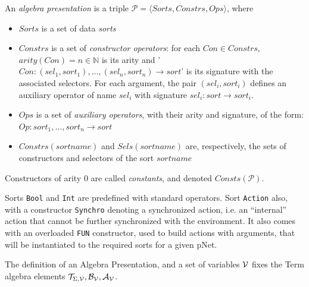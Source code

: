 \documentclass[smallcondensed]{svjour3}
\newcommand{\noteSB}[2][color=green!40, size=\tiny]{\todo[#1]{{\bf
      Note: } {#2}}}
\newcommand{\cT}{\ensuremath{\mathcal{T}}}
\newcommand{\cV}{\ensuremath{\mathcal{V}}}
\newcommand{\signature}{\ensuremath{\Sigma}}
\newcommand{\variables}{\ensuremath{\cV}}
\newcommand{\Talg}{\ensuremath{\cT_{\signature,\variables}}}
\def\AlgA{\mathcal{A}}
\def\AlgB{\mathcal{B}}
\newcommand{\mdash}{---}
\begin{document}
\def\APres{\mathcal{P}}
\begin{definition}
  An \emph{algebra presentation} is a triple $\APres=\langle\mathit{Sorts},\mathit{Constrs},\mathit{Ops}\rangle$, where

  \begin{itemize}
  \item $Sorts$ is a set of data \emph{sorts}
  \item $\mathit{Constrs}$ is a set of \emph{constructor operators}: for each $\mathit{Con} \in \mathit{Constrs}$, $arity(Con)=n \in \mathbb{N}$ is its arity 
    and '$Con : (\mathit{sel}_1,\mathit{sort}_1), \dots, (\mathit{sel}_n,\mathit{sort}_n) \rightarrow \mathit{sort}$' is its signature with the associated selectors.
    For each argument, the pair $(\mathit{sel}_i,\mathit{sort}_i)$ defines an auxiliary
    operator of name $\mathit{sel}_i$ with signature $\mathit{sel}_i : \mathit{sort} \rightarrow \mathit{sort}_i$.
    \item $Ops$ is a set of \emph{auxiliary operators}, with their
      arity and signature, of the form: $Op : \mathit{sort}_1, \dots,  \mathit{sort}_n \rightarrow
      \mathit{sort}$
      \item $\mathit{Constrs}(\mathit{sortname})$ and $\mathit{Sels}(\mathit{sortname})$ are, respectively, the sets of
        constructors and selectors of the sort $\mathit{sortname}$
  \end{itemize}
  Constructors of arity 0 are called \emph{constants}, and denoted $\mathit{Consts}(\APres)$.
\end{definition}


Sorts \texttt{Bool} and \texttt{Int} are predefined with standard operators.
Sort \texttt{Action} also, with a constructor \texttt{Synchro} denoting
a synchronized action, i.e. an ``internal'' action that cannot be
further synchronized with the environment. It also comes with an
overloaded \texttt{FUN} constructor, used to build actions with
arguments, that will be instantiated to the required sorts for a given
pNet.

The definition of an Algebra Presentation, and a set of variables
$\P$ fixes the Term algebra elements $\Talg, \AlgB_{\P}, \AlgA_\P$.
\end{document}
